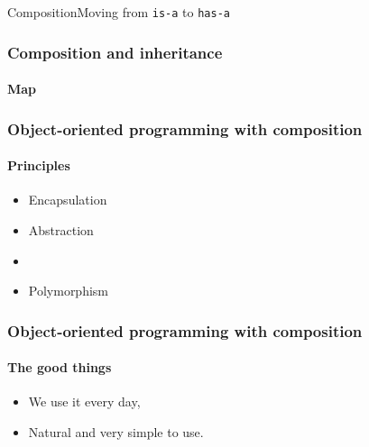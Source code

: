 \begin{sepframe}{Composition}{Moving from \texttt{is-a} to \texttt{has-a}}
\end{sepframe}

\begin{frame}[fragile,c]
    \frametitle{Composition and inheritance}
    \framesubtitle{Map}

\end{frame}

\begin{frame}
    \frametitle{Object-oriented programming with composition}
    \framesubtitle{Principles}

    \begin{itemize}[<+->]
        \item Encapsulation
        \item Abstraction
        \item {}
        \item Polymorphism
    \end{itemize}
\end{frame}

\begin{frame}
    \frametitle{Object-oriented programming with composition}
    \framesubtitle{The good things}

    \begin{itemize}[<+->]
        \item We use it every day,
        \item Natural and very simple to use.
    \end{itemize}
\end{frame}

